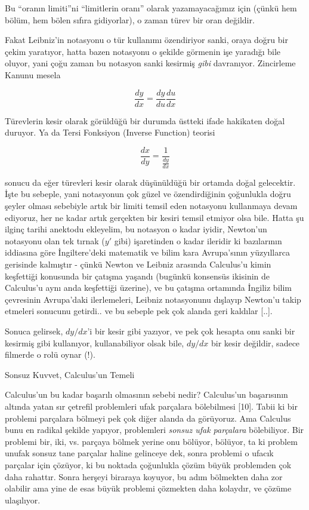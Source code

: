 \documentclass[12pt,fleqn]{article}\usepackage{../../common}
\begin{document}
Bu ``oranın limiti''ni ``limitlerin oranı'' olarak yazamayacağımız için
(çünkü hem bölüm, hem bölen sıfıra gidiyorlar), o zaman türev bir oran
değildir.

Fakat Leibniz'in notasyonu o tür kullanımı özendiriyor sanki, oraya doğru bir
çekim yaratıyor, hatta bazen notasyonu o şekilde görmenin işe yaradığı bile
oluyor, yani çoğu zaman bu notasyon sanki kesirmiş {\em gibi}
davranıyor. Zincirleme Kanunu mesela

$$ \frac{dy}{dx} = \frac{dy}{du}\frac{du}{dx} $$

Türevlerin kesir olarak görüldüğü bir durumda üstteki ifade hakikaten doğal
duruyor. Ya da Tersi Fonksiyon (Inverse Function) teorisi

$$ \frac{dx}{dy} = \frac{1}{\frac{dy}{dx}} $$

sonucu da eğer türevleri kesir olarak düşünüldüğü bir ortamda doğal
gelecektir. İşte bu sebeple, yani notasyonun çok güzel ve özendirdiğinin
çoğunlukla doğru şeyler olması sebebiyle artık bir limiti temsil eden
notasyonu kullanmaya devam ediyoruz, her ne kadar artık gerçekten bir
kesiri temsil etmiyor olsa bile. Hatta şu ilginç tarihi anektodu ekleyelim,
bu notasyon o kadar iyidir, Newton'un notasyonu olan tek tırnak ($y'$ gibi)
işaretinden o kadar ileridir ki bazılarının iddiasına göre İngiltere'deki
matematik ve bilim kara Avrupa'sının yüzyıllarca gerisinde kalmıştır -
çünkü Newton ve Leibniz arasında Calculus'u kimin keşfettiği konusunda bir
çatışma yaşandı (bugünkü konsensüs ikisinin de Calculus'u aynı anda
keşfettiği üzerine), ve bu çatışma ortamında İngiliz bilim çevresinin
Avrupa'daki ilerlemeleri, Leibniz notasyonunu dışlayıp Newton'u takip
etmeleri sonucunu getirdi.. ve bu sebeple pek çok alanda geri kaldılar
[..].

Sonuca gelirsek, $dy/dx$'i bir kesir gibi yazıyor, ve pek çok hesapta onu
sanki bir kesirmiş gibi kullanıyor, kullanabiliyor olsak bile, $dy/dx$ bir
kesir değildir, sadece filmerde o rolü oynar (!).

\newpage 

Sonsuz Kuvvet, Calculus'un Temeli

Calculus'un bu kadar başarılı olmasının sebebi nedir? Calculus'un
başarısının altında yatan sır çetrefil problemleri ufak parçalara
bölebilmesi [10]. Tabii ki bir problemi parçalara bölmeyi pek çok diğer
alanda da görüyoruz. Ama Calculus bunu en radikal şekilde yapıyor,
problemleri {\em sonsuz ufak parçalara} bölebiliyor. Bir problemi bir, iki,
vs. parçaya bölmek yerine onu bölüyor, bölüyor, ta ki problem unufak sonsuz
tane parçalar haline gelinceye dek, sonra problemi o ufacık parçalar için
çözüyor, ki bu noktada çoğunlukla çözüm büyük problemden çok daha rahattır.
Sonra herşeyi biraraya koyuyor, bu adım bölmekten daha zor olabilir ama
yine de esas büyük problemi çözmekten daha kolaydır, ve çözüme ulaşılıyor.
\end{document}
